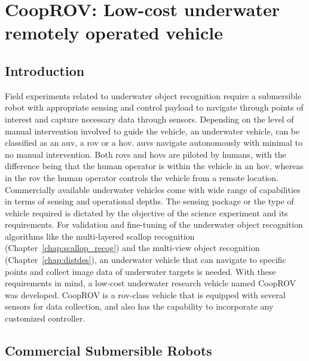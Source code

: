 
\chapter{CoopROV: Low-cost underwater remotely operated vehicle}
\label{chap:cooprov}


\section{Introduction}

Field experiments related to underwater object recognition require a submersible robot with appropriate sensing and control payload to navigate through points of interest and capture necessary data through sensors. Depending on the level of manual intervention involved to guide the vehicle, an underwater vehicle, can be classified as an \gls{auv}, a \gls{rov} or a \gls{hov}. \gls{auv}s navigate autonomously with minimal to no manual intervention. Both \gls{rov}s and \gls{hov}s are piloted by humans, with the difference being that the human operator is within the vehicle in an \gls{hov}, whereas in the \gls{rov} the human operator controls the vehicle from a remote location. Commercially available underwater vehicles come with wide range of capabilities in terms of sensing and operational depths. The sensing package or the type of vehicle required is dictated by the objective of the science experiment and its requirements. For validation and fine-tuning of the underwater object recognition algorithms like the 
multi-layered scallop recognition (Chapter~\ref{chap:scallop_recog}) and the multi-view object recognition (Chapter~\ref{chap:distdes}), an underwater vehicle that can navigate to specific points and collect image data of underwater targets is needed. With these requirements in mind, a low-cost underwater research vehicle named CoopROV was developed. CoopROV is a \gls{rov}-class vehicle that is equipped with several sensors for data collection, and also has the capability to incorporate any customized controller.

\section{Commercial Submersible Robots}

